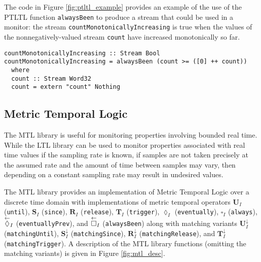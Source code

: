 The code in Figure \ref{fig:ptltl_example} provides an example of the use of the PTLTL function
\verb,alwaysBeen, to produce a stream that could be used in a monitor:
the stream \verb,countMonotonicallyIncreasing, is true when the values of
the nonnegatively-valued stream \verb,count, have increased monotonically
so far.

\begin{figure*}[!htb]
\begin{lstlisting}[frame=none]
countMonotonicallyIncreasing :: Stream Bool
countMonotonicallyIncreasing = alwaysBeen (count >= ([0] ++ count))
  where
  count :: Stream Word32
  count = extern "count" Nothing
\end{lstlisting}
\caption{An example use of PLTL library function {\tt alwaysBeen}.}
\label{fig:ptltl_example}
\end{figure*}

\subsection{Metric Temporal Logic}
The MTL library is useful for monitoring properties involving
bounded real time.
While the LTL library can be used to monitor properties
associated with real time values if the sampling rate is known, if
samples are not taken precisely at the assumed rate and the amount
of time between samples may vary, then depending on a constant
sampling rate may result in undesired values.

The MTL library provides an implementation of Metric Temporal Logic over a discrete time domain
with implementations of metric temporal operators
$\mathbf{U}_{I}$ (\verb,until,), $\mathbf{S}_{I}$ ({\tt since}),
$\mathbf{R}_{I}$ ({\tt release}),
$\mathbf{T}_{I}$ (\verb,trigger,), $\lozenge_{I}$ ({\tt eventually}),
$\square_{I}$ (\verb,always,),
$\overset{\leftarrow}{\lozenge}_{I}$ ({\tt eventuallyPrev}), and
$\overset{\leftarrow}{\square}_{I}$ ({\tt alwaysBeen}) along with matching variants
$\mathbf{U}^{\downarrow}_{I}$ ({\tt matchingUntil}),
$\mathbf{S}^{\downarrow}_{I}$ ({\tt matchingSince}),
$\mathbf{R}^{\downarrow}_{I}$ ({\tt matchingRelease}),
and $\mathbf{T}^{\downarrow}_{I}$ ({\tt matchingTrigger}).
A description of the MTL library functions (omitting the matching variants)
is given in Figure \ref{fig:mtl_desc}.

